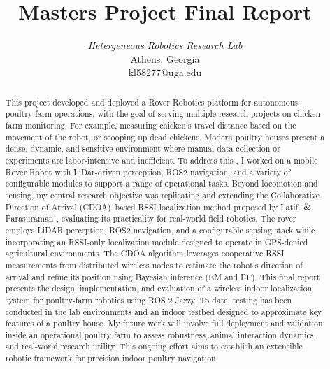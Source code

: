 \documentclass[conference]{IEEEtran}
\begin{document}
\title{Masters Project Final Report}



\author{
\textit{Hetergeneous Robotics Research Lab}\\
Athens, Georgia \\
kl58277@uga.edu}

\maketitle

\begin{abstract}
This project developed and deployed a Rover Robotics platform for autonomous poultry-farm operations, with the goal of serving multiple research projects on chicken farm monitoring. For example, measuring chicken's travel distance based on the movement of the robot, or scooping up dead chickens. Modern poultry houses present a dense, dynamic, and sensitive environment where manual data collection or experiments are labor-intensive and inefficient. To address this , I worked on a mobile Rover Robot with LiDar-driven perception, ROS2 navigation, and a variety of configurable modules to support a range of operational tasks. Beyond locomotion and sensing, my central research objective was replicating and extending the Collaborative Direction of Arrival (CDOA)–based RSSI localization method proposed by Latif $\And$ Parasuraman \cite{b1}, evaluating its practicality for real-world field robotics. The rover employs LiDAR perception, ROS2 navigation, and a configurable sensing stack while incorporating an RSSI-only localization module designed to operate in GPS-denied agricultural environments. The CDOA algorithm leverages cooperative RSSI measurements from distributed wireless nodes to estimate the robot’s direction of arrival and refine its position using Bayesian inference (EM and PF). This final report presents the design, implementation, and evaluation of a wireless indoor localization system for poultry-farm robotics using ROS 2 Jazzy. 
To date, testing has been conducted in the lab environments and an indoor testbed designed to approximate key features of a poultry house. My future work will involve full deployment and validation inside an operational poultry farm to assess robustness, animal interaction dynamics, and real-world research utility. This ongoing effort aims to establish an extensible robotic framework for precision indoor poultry navigation.
\end{abstract}
\end{document}
